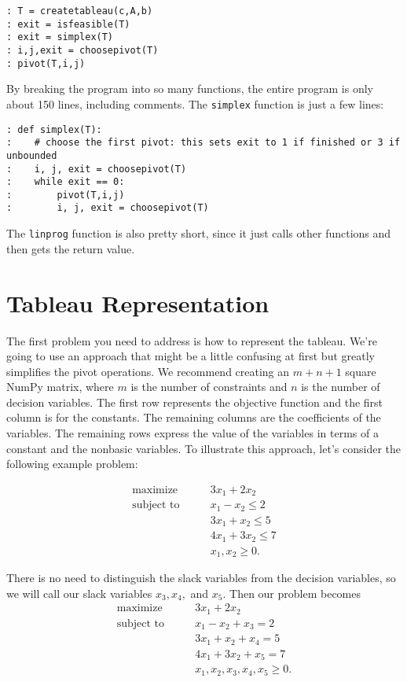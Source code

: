 \begin{lstlisting}
: T = createtableau(c,A,b)
: exit = isfeasible(T)
: exit = simplex(T)
: i,j,exit = choosepivot(T)
: pivot(T,i,j)
\end{lstlisting}


By breaking the program into so many functions, the entire program is only about 150 lines, including comments.  The {\tt simplex} function is just a few lines:

\begin{lstlisting}
: def simplex(T):
:    # choose the first pivot: this sets exit to 1 if finished or 3 if unbounded
:    i, j, exit = choosepivot(T)
:    while exit == 0:
:        pivot(T,i,j)
:        i, j, exit = choosepivot(T)
\end{lstlisting}
The {\tt linprog} function is also pretty short, since it just calls other functions and then gets the return value.

\section*{Tableau Representation}

The first problem you need to address is how to represent the tableau. We're going to use an approach that might be a little confusing at first but greatly simplifies the pivot operations. We recommend creating an $m + n + 1$ square NumPy matrix, where $m$ is the number of constraints and $n$ is the number of decision variables.  The first row represents the objective function and the first column is for the constants. The remaining columns are the coefficients of the variables. The remaining rows express the value of the variables in terms of a constant and the nonbasic variables. To illustrate this approach, let's consider the following example problem:

\begin{align*}
	\mbox{maximize}\qquad
        &    3x_1 + 2x_2 \\
	\mbox{subject to}\qquad
        &     x_1 - x_2 \leq 2 \\
		&	 3x_1 + x_2 \leq 5 \\
		&	 4x_1 + 3x_2 \leq 7 \\
		&     x_1, x_2 \geq 0.
\end{align*}

There is no need to distinguish the slack variables from the decision variables, so we will call our slack variables $x_3, x_4,$ and $x_5$. Then our problem becomes
\begin{align*}
	\mbox{maximize}\qquad
        &    3x_1 + 2x_2 \\
	\mbox{subject to}\qquad
        &     x_1 - x_2 + x_3 = 2 \\
		&	 3x_1 + x_2 + x_4 = 5 \\
		&	 4x_1 + 3x_2 + x_5 = 7 \\
		&     x_1, x_2, x_3, x_4, x_5 \geq 0.
\end{align*}

